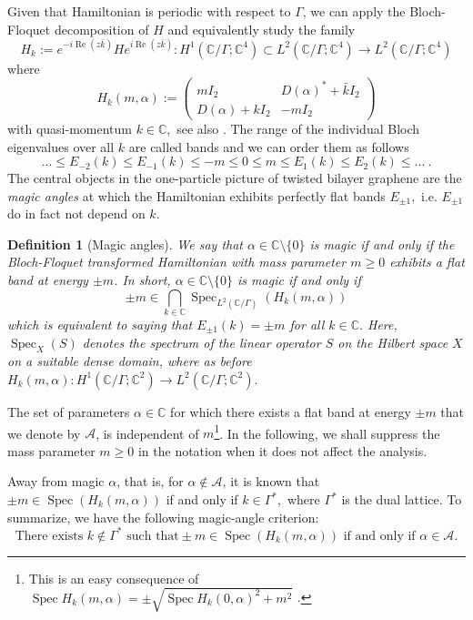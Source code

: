 \documentclass[reqno,12pt,letterpaper]{amsart}
\newcommand{\CC}{{\mathbb C}}
\newtheorem{defi}[theo]{Definition}
\numberwithin{equation}{section}
\DeclareMathOperator{\Spec}{Spec}
\DeclareMathOperator{\Real}{Re}
\let\Re=\Real
\begin{document}
Given that Hamiltonian is periodic with respect to $\Gamma$, we can apply the Bloch-Floquet decomposition of $H$ and equivalently study the family 
\[ H_k:=e^{-i \Re(z \bar k)} H e^{i \Re(z \bar k)}: H^1(\CC/\Gamma;\CC^4) \subset L^2(\CC/\Gamma;\CC^4) \to L^2(\CC/\Gamma;\CC^4)\]
where
\begin{equation}
\label{eq:Bloch_Hamiltonian}
 H_k(m,\alpha):= \begin{pmatrix} m I_2 & D(\alpha)^* + \bar k I_2 \\ D(\alpha)+k I_2 & -m I_2 \end{pmatrix} \end{equation}
with quasi-momentum $k \in \mathbb C,$ see also \cite[(2.11)]{beta}. The range of the individual Bloch eigenvalues over all $k$ are called bands and we can order them as follows
\[ ...\le E_{-2}(k)\le E_{-1}(k) \le -m \le 0 \le m \le E_1(k)\le E_2(k)\le ... \ .\]
The central objects in the one-particle picture of twisted bilayer graphene are the \emph{magic angles} at which the Hamiltonian exhibits perfectly flat bands $E_{\pm 1},$ i.e. $E_{\pm 1}$ do in fact not depend on $k$.

\begin{defi}[Magic angles] 
\label{defi:magic_angles} 
We say that $\alpha \in \mathbb C\setminus \{0\}$ is \emph{magic} if and only if the Bloch-Floquet transformed Hamiltonian with mass parameter $m \ge 0$ exhibits a flat band at energy $\pm m$. In short, $\alpha \in \CC \setminus \{0\}$ is magic if and only if
\begin{equation}
\label{eq:flat_band}
 \pm m \in\bigcap_{k \in \CC} \Spec_{L^2(\CC/\Gamma)}(H_{k}(m,\alpha))
 \end{equation}
 which is equivalent to saying that $E_{\pm 1}(k)=\pm m$ for all $k \in \CC.$
Here, $\Spec_{X}(S)$ denotes the spectrum of the linear operator $S$ on the Hilbert space $X$ on a suitable dense domain, where as before $H_{k}(m,\alpha):H^1(\CC/\Gamma;\CC^2) \to L^2(\CC/\Gamma;\CC^2).$ \end{defi}
 The set of parameters  $\alpha \in \CC$ for which there exists a flat band at energy $\pm m$ that we denote by $\mathcal A$, is independent of $m$\footnote{This is an easy consequence of $\Spec H_k(m,\alpha) = \pm \sqrt{ \Spec H_k(0,\alpha)^2 + m^2}$ \cite[(5.66)]{T92}.}. In the following, we shall suppress the mass parameter $m \ge 0$ in the notation when it does not affect the analysis.
 
Away from magic $\alpha$, that is, for $\alpha \notin \mathcal A$, it is known that $\pm m  \in \Spec(H_k(m,\alpha))$ if and only if $k \in \Gamma^*,$ where $\Gamma^*$ is the dual lattice.  
To summarize, we have the following magic-angle criterion:  
\begin{equation}
\label{eq:criterion}
\text{There exists }k \notin \Gamma^*\text{ such that} \pm m  \in \Spec(H_k(m,\alpha))\text{ if and only if  }\alpha \in \mathcal A.
\end{equation}
\end{document}

